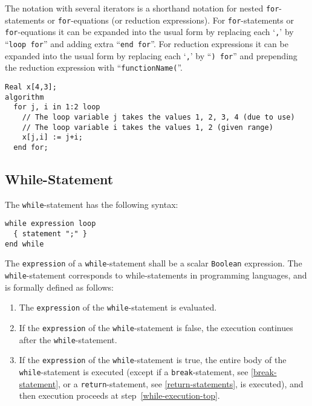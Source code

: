 The notation with several iterators is a shorthand notation for nested \lstinline!for!-statements or \lstinline!for!-equations (or reduction expressions).
For \lstinline!for!-statements or \lstinline!for!-equations it can be expanded into the usual form by replacing each `\lstinline!,!' by ``\lstinline!loop for!'' and adding extra ``\lstinline!end for!''.
For reduction expressions it can be expanded into the usual form by replacing each `\lstinline!,!' by ``\lstinline!) for!'' and prepending the reduction expression with ``\lstinline!functionName(!''.

\begin{example}
\begin{lstlisting}[language=modelica]
  Real x[4,3];
algorithm
  for j, i in 1:2 loop
    // The loop variable j takes the values 1, 2, 3, 4 (due to use)
    // The loop variable i takes the values 1, 2 (given range)
    x[j,i] := j+i;
  end for;
\end{lstlisting}
\end{example}

\subsection{While-Statement}\label{while-statement}

The \lstinline!while!-statement has the following syntax:
\begin{lstlisting}[language=grammar]
while expression loop
  { statement ";" }
end while
\end{lstlisting}
The \lstinline!expression! of a \lstinline!while!-statement shall be a scalar \lstinline!Boolean! expression.
The \lstinline!while!-statement corresponds to while-statements in programming languages, and is formally defined as follows:
\begin{enumerate}
\item
  \label{while-execution-top}
  The \lstinline!expression! of the \lstinline!while!-statement is evaluated.
\item
  If the \lstinline!expression! of the \lstinline!while!-statement is false, the execution continues after the \lstinline!while!-statement.
\item
  If the \lstinline!expression! of the \lstinline!while!-statement is true, the entire body of the \lstinline!while!-statement is executed (except if a \lstinline!break!-statement, see \cref{break-statement}, or a \lstinline!return!-statement, see \cref{return-statements}, is executed), and then execution proceeds at step~\ref{while-execution-top}.
\end{enumerate}

